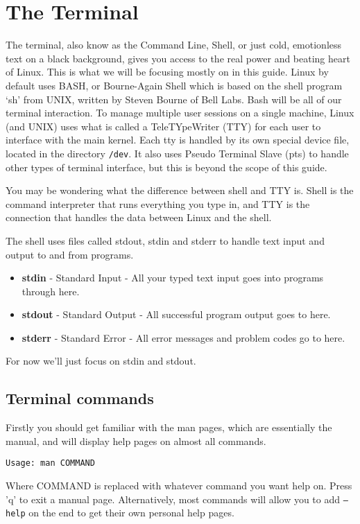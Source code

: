 \documentclass{article}
\begin{document}
\section{The Terminal}
The terminal, also know as the Command Line, Shell, or just cold, emotionless text on a black background, gives you access to the real power and beating heart of Linux. This is what we will be focusing mostly on in this guide. Linux by default uses BASH, or Bourne-Again Shell which is based on the shell program `sh' from UNIX, written by Steven Bourne of Bell Labs. Bash will be all of our terminal interaction. 
To manage multiple user sessions on a single machine, Linux (and UNIX) uses what is called a TeleTYpeWriter (TTY) for each user to interface with the main kernel. Each tty is handled by its own special device file, located in the directory \texttt{/dev}. It also uses Pseudo Terminal Slave (pts) to handle other types of terminal interface, but this is beyond the scope of this guide.

You may be wondering what the difference between shell and TTY is. Shell is the command interpreter that runs everything you type in, and TTY is the connection that handles the data between Linux and the shell.

The shell uses files called stdout, stdin and stderr to handle text input and output to and from programs.

\begin{itemize}
\item \textbf{stdin} - Standard Input - All your typed text input goes into programs through here.
\item \textbf{stdout} - Standard Output - All successful program output goes to here.
\item \textbf{stderr} - Standard Error - All error messages and problem codes go to here. 
\end{itemize}
For now we'll just focus on stdin and stdout.

\subsection{Terminal commands}
Firstly you should get familiar with the man pages, which are essentially the manual, and will display help pages on almost all commands.
\begin{verbatim}
Usage: man COMMAND
\end{verbatim}
Where COMMAND is replaced with whatever command you want help on. Press 'q' to exit a manual page. Alternatively, most commands will allow you to add \texttt{--help} on the end to get their own personal help pages.
\end{document}
